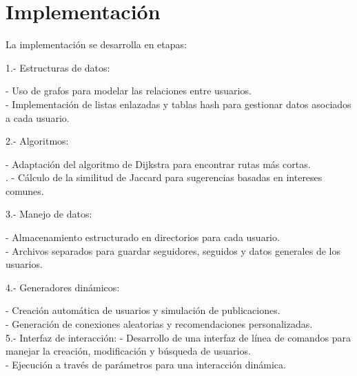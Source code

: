 \section{Implementación}
La implementación se desarrolla en etapas:

    1.- Estructuras de datos:

	\hspace{1cm}- Uso de grafos para modelar las relaciones entre usuarios.\\
	\hspace{1cm}- Implementación de listas enlazadas y tablas hash para gestionar datos asociados a cada usuario.

    2.- Algoritmos:

	\hspace{1cm}- Adaptación del algoritmo de Dijkstra para encontrar rutas más cortas.\\.
	\hspace{1cm}- Cálculo de la similitud de Jaccard para sugerencias basadas en intereses comunes.

    3.- Manejo de datos:

	\hspace{1cm}- Almacenamiento estructurado en directorios para cada usuario.\\
	\hspace{1cm}- Archivos separados para guardar seguidores, seguidos y datos generales de los usuarios.

    4.- Generadores dinámicos:

	\hspace{1cm}- Creación automática de usuarios y simulación de publicaciones.\\
	\hspace{1cm}- Generación de conexiones aleatorias y recomendaciones personalizadas. \\

    5.- Interfaz de interacción:
	\hspace{1cm}- Desarrollo de una interfaz de línea de comandos para manejar la creación, modificación y búsqueda de usuarios.\\
	\hspace{1cm}- Ejecución a través de parámetros para una interacción dinámica.

